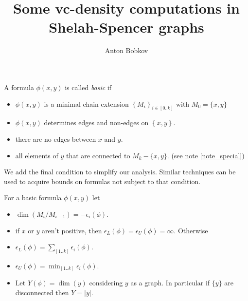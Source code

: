 \documentclass{amsart}
\title{Some vc-density computations in Shelah-Spencer graphs}
\author{Anton Bobkov}
\newcommand{\curly}[1]{\left\{#1\right\}}
\newcommand{\paren}[1]{\left(#1\right)}
\begin{document}
\maketitle

\begin{Definition}
	A formula $\phi(x, y)$ is called \emph{basic} if
	\begin{itemize}
		\item $\phi(x, y)$ is a minimal chain extension $\curly{M_i}_{i \in [0..k]}$ with $M_0 = \{x, y\}$
		\item $\phi(x, y)$ determines edges and non-edges on $\curly{x, y}$.
		\item there are no edges between $x$ and $y$.
		\item all elements of $y$ that are connected to $M_k - \{x,y\}$. (see note \ref{note_special})
	\end{itemize}
\end{Definition}




\begin{Note} \label{note_special}
	We add the final condition to simplify our analysis. Similar techniques can be used to acquire bounds on formulas not subject to that condition.
\end{Note}

\begin{Definition}
	For a basic formula $\phi(x, y)$ let
	\begin{itemize}
		\item $\dim \paren{M_i/M_{i-1}} = -\epsilon_i(\phi)$.
		\item if $x$ or $y$ aren't positive, then $\epsilon_L(\phi) = \epsilon_U(\phi) = \infty$. Otherwise
		\item $\epsilon_L(\phi) = \sum_{[1..k]} \epsilon_i(\phi)$.
		\item $\epsilon_U(\phi) = \min_{[1..k]} \epsilon_i(\phi)$.
		\item Let $Y(\phi) = \dim (y)$ considering $y$ as a graph.
		In particular if $\{y\}$ are disconnected then $Y = |y|$.
	\end{itemize}
\end{Definition}
\end{document}
